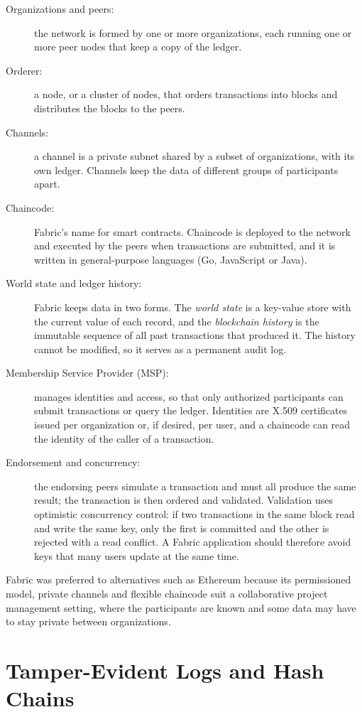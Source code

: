 \begin{description}
    \item[Organizations and peers:] the network is formed by one or more organizations, each running one or more peer nodes that keep a copy of the ledger.
    \item[Orderer:] a node, or a cluster of nodes, that orders transactions into blocks and distributes the blocks to the peers.
    \item[Channels:] a channel is a private subnet shared by a subset of organizations, with its own ledger. Channels keep the data of different groups of participants apart.
    \item[Chaincode:] Fabric's name for smart contracts. Chaincode is deployed to the network and executed by the peers when transactions are submitted, and it is written in general-purpose languages (Go, JavaScript or Java).
    \item[World state and ledger history:] Fabric keeps data in two forms. The \emph{world state} is a key-value store with the current value of each record, and the \emph{blockchain history} is the immutable sequence of all past transactions that produced it. The history cannot be modified, so it serves as a permanent audit log.
    \item[Membership Service Provider (MSP):] manages identities and access, so that only authorized participants can submit transactions or query the ledger. Identities are X.509 certificates issued per organization or, if desired, per user, and a chaincode can read the identity of the caller of a transaction.
    \item[Endorsement and concurrency:] the endorsing peers simulate a transaction and must all produce the same result; the transaction is then ordered and validated. Validation uses optimistic concurrency control: if two transactions in the same block read and write the same key, only the first is committed and the other is rejected with a read conflict. A Fabric application should therefore avoid keys that many users update at the same time.
\end{description}

Fabric was preferred to alternatives such as Ethereum because its permissioned model, private channels and flexible chaincode suit a collaborative project management setting, where the participants are known and some data may have to stay private between organizations.

\section{Tamper-Evident Logs and Hash Chains}
\label{sec:hash-chains}

